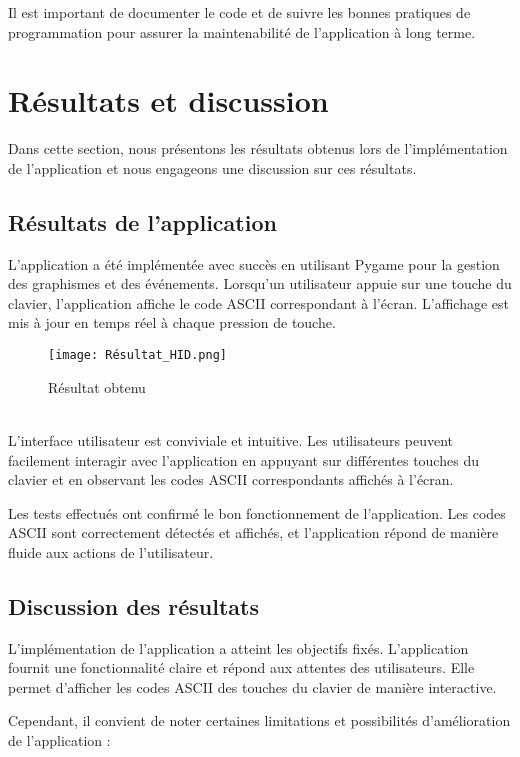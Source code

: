 \documentclass[12pt,a4paper]{report}
\begin{document}
Il est important de documenter le code et de suivre les bonnes pratiques de programmation pour assurer la maintenabilité de l'application à long terme.\\
\newpage

\section{Résultats et discussion}

Dans cette section, nous présentons les résultats obtenus lors de l'implémentation de l'application et nous engageons une discussion sur ces résultats.

\subsection{Résultats de l'application}
L'application a été implémentée avec succès en utilisant Pygame pour la gestion des graphismes et des événements. Lorsqu'un utilisateur appuie sur une touche du clavier, l'application affiche le code ASCII correspondant à l'écran. L'affichage est mis à jour en temps réel à chaque pression de touche.\\
\begin{figure}[h]
    \centering
    \texttt{[image: Résultat\_HID.png]}
    \caption{Résultat obtenu}
    \label{fig:exemple}
\end{figure}
\\
L'interface utilisateur est conviviale et intuitive. Les utilisateurs peuvent facilement interagir avec l'application en appuyant sur différentes touches du clavier et en observant les codes ASCII correspondants affichés à l'écran.

Les tests effectués ont confirmé le bon fonctionnement de l'application. Les codes ASCII sont correctement détectés et affichés, et l'application répond de manière fluide aux actions de l'utilisateur.

\subsection{Discussion des résultats}
L'implémentation de l'application a atteint les objectifs fixés. L'application fournit une fonctionnalité claire et répond aux attentes des utilisateurs. Elle permet d'afficher les codes ASCII des touches du clavier de manière interactive.

Cependant, il convient de noter certaines limitations et possibilités d'amélioration de l'application :
\end{document}
